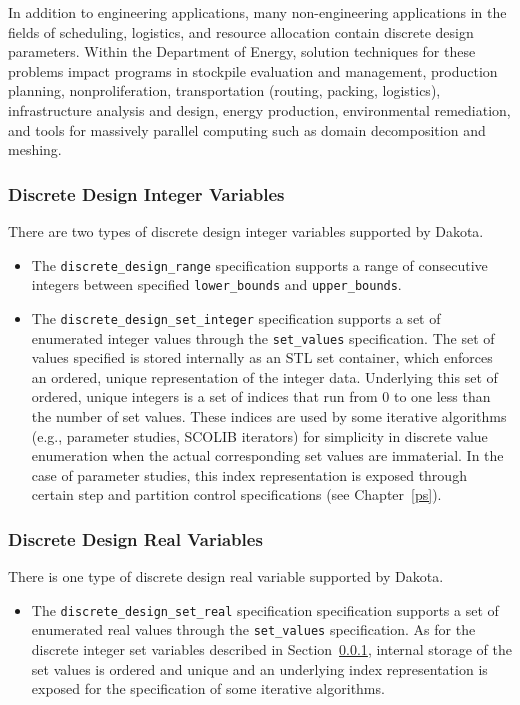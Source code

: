 In addition to engineering applications, many non-engineering
applications in the fields of scheduling, logistics, and resource
allocation contain discrete design parameters. Within the Department
of Energy, solution techniques for these problems impact programs in
stockpile evaluation and management, production planning,
nonproliferation, transportation (routing, packing, logistics),
infrastructure analysis and design, energy production, environmental
remediation, and tools for massively parallel computing such as domain
decomposition and meshing.

\subsubsection{Discrete Design Integer Variables}\label{variables:design:ddiv}

There are two types of discrete design integer variables supported by
Dakota.
\begin{itemize}

\item  The \texttt{discrete\_design\_range} specification supports a
range of consecutive integers between specified \texttt{lower\_bounds}
and \texttt{upper\_bounds}.

\item The \texttt{discrete\_design\_set\_integer} specification supports 
a set of enumerated integer values through the \texttt{set\_values} 
specification.  The set of values specified is stored internally as an 
STL set container, which enforces an ordered, unique representation of 
the integer data.  Underlying this set of ordered, unique integers is a 
set of indices that run from 0 to one less than the number of set values.
These indices are used by some iterative algorithms (e.g., parameter 
studies, SCOLIB iterators) for simplicity in discrete value enumeration 
when the actual corresponding set values are immaterial.  In the case of 
parameter studies, this index representation is exposed through certain 
step and partition control specifications (see Chapter~\ref{ps}).

\end{itemize}

\subsubsection{Discrete Design Real Variables}\label{variables:design:ddrv}

There is one type of discrete design real variable supported by
Dakota.
\begin{itemize}

\item The \texttt{discrete\_design\_set\_real} specification
specification supports a set of enumerated real values through the
\texttt{set\_values} specification.  As for the discrete integer
set variables described in Section~\ref{variables:design:ddiv},
internal storage of the set values is ordered and unique and an
underlying index representation is exposed for the specification of
some iterative algorithms.

\end{itemize}


